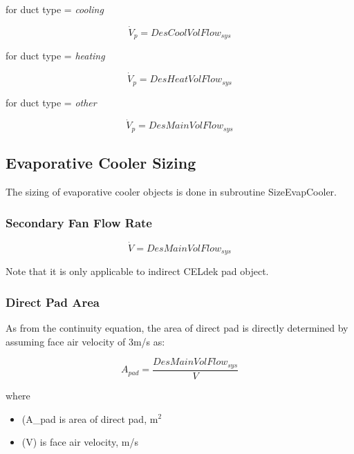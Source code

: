 for duct type = \emph{cooling}

\begin{equation}
{\dot V_p} = DesCoolVolFlo{w_{sys}}
\end{equation}

for duct type = \emph{heating}

\begin{equation}
{\dot V_p} = DesHeatVolFlo{w_{sys}}
\end{equation}

for duct type = \emph{other}

\begin{equation}
{\dot V_p} = DesMainVolFlo{w_{sys}}
\end{equation}

\subsection{Evaporative Cooler Sizing}\label{evaporative-cooler-sizing}

The sizing of evaporative cooler objects is done in subroutine SizeEvapCooler.

\subsubsection{Secondary Fan Flow Rate}\label{secondary-fan-flow-rate-1}

\begin{equation}
\dot V = DesMainVolFlo{w_{sys}}
\end{equation}

Note that it is only applicable to indirect CELdek pad object.

\subsubsection{Direct Pad Area}\label{direct-pad-area}

As from the continuity equation, the area of direct pad is directly determined by assuming face air velocity of 3m/s as:

\begin{equation}
{A_{pad}} = \frac{{DesMainVolFlo{w_{sys}}}}{V}
\end{equation}

where

\begin{itemize}
\item
  (A\_\rm{pad} is area of direct pad, m$^{2}$
\item
  (V) is face air velocity, m/s
\end{itemize}

